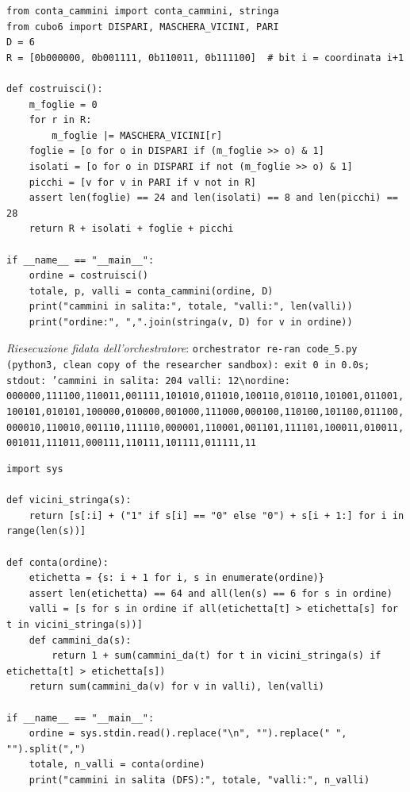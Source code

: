 \documentclass[11pt,a4paper]{article}
\begin{document}
\begin{lstlisting}[caption={attempt\_001 code\_5 [python, rigore exact] — Upper bound: builds the 204-path labelling (peaks = even vertices minus the distance-4 cod — approvato dal Referee}]
from conta_cammini import conta_cammini, stringa
from cubo6 import DISPARI, MASCHERA_VICINI, PARI
D = 6
R = [0b000000, 0b001111, 0b110011, 0b111100]  # bit i = coordinata i+1

def costruisci():
    m_foglie = 0
    for r in R:
        m_foglie |= MASCHERA_VICINI[r]
    foglie = [o for o in DISPARI if (m_foglie >> o) & 1]
    isolati = [o for o in DISPARI if not (m_foglie >> o) & 1]
    picchi = [v for v in PARI if v not in R]
    assert len(foglie) == 24 and len(isolati) == 8 and len(picchi) == 28
    return R + isolati + foglie + picchi

if __name__ == "__main__":
    ordine = costruisci()
    totale, p, valli = conta_cammini(ordine, D)
    print("cammini in salita:", totale, "valli:", len(valli))
    print("ordine:", ",".join(stringa(v, D) for v in ordine))

\end{lstlisting}
\noindent\emph{Riesecuzione fidata dell'orchestratore}: \texttt{orchestrator re-ran code\_5.py (python3, clean copy of the researcher sandbox): exit 0 in 0.0s; stdout: 'cammini in salita: 204 valli: 12\textbackslash{}nordine: 000000,111100,110011,001111,101010,011010,100110,010110,101001,011001,100101,010101,100000,010000,001000,111000,000100,110100,101100,011100,000010,110010,001110,111110,000001,110001,001101,111101,100011,010011,001011,111011,000111,110111,101111,011111,11}
\begin{lstlisting}[caption={attempt\_001 code\_6 [python, rigore exact] — Independent verification of the submitted labelling (string-based, no shared code): reads  — approvato dal Referee}]
import sys

def vicini_stringa(s):
    return [s[:i] + ("1" if s[i] == "0" else "0") + s[i + 1:] for i in range(len(s))]

def conta(ordine):
    etichetta = {s: i + 1 for i, s in enumerate(ordine)}
    assert len(etichetta) == 64 and all(len(s) == 6 for s in ordine)
    valli = [s for s in ordine if all(etichetta[t] > etichetta[s] for t in vicini_stringa(s))]
    def cammini_da(s):
        return 1 + sum(cammini_da(t) for t in vicini_stringa(s) if etichetta[t] > etichetta[s])
    return sum(cammini_da(v) for v in valli), len(valli)

if __name__ == "__main__":
    ordine = sys.stdin.read().replace("\n", "").replace(" ", "").split(",")
    totale, n_valli = conta(ordine)
    print("cammini in salita (DFS):", totale, "valli:", n_valli)

\end{lstlisting}
\end{document}
